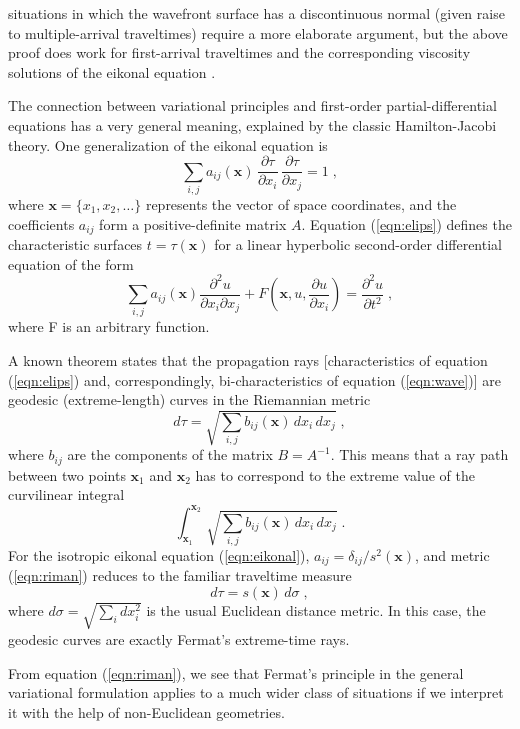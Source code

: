 situations in which the wavefront surface has a discontinuous normal
(given raise to multiple-arrival traveltimes) require a more elaborate
argument, but the above proof does work for first-arrival traveltimes
and the corresponding viscosity solutions of the eikonal equation
\cite[]{lions}.
\par
The connection between variational principles and first-order
partial-differential equations has a very general meaning, explained
by the classic Hamilton-Jacobi theory. One generalization of the
eikonal equation is 
\begin{equation}\label{eqn:elips}
  \sum_{i,j} a_{ij} (\mathbf{x})\,
  \frac{\partial \tau}{\partial x_i}\,
  \frac{\partial \tau}{\partial x_j} = 1\;,
\end{equation}
where $\mathbf{x} = \{x_1, x_2, \ldots\}$ represents the vector of space
coordinates, and the coefficients $a_{ij}$ form a positive-definite
matrix $A$.  Equation (\ref{eqn:elips}) defines the characteristic
surfaces $t = \tau (\mathbf{x})$ for a linear hyperbolic second-order
differential equation of the form
\begin{equation}\label{eqn:wave}
  \sum_{i,j} a_{ij} (\mathbf{x})
  \frac{\partial^2 u}{\partial x_i \partial x_j} +
  F (\mathbf{x}, u, \frac{\partial u}{\partial x_i}) =
  \frac{\partial^2 u}{\partial t^2}\;,
\end{equation}
where F is an arbitrary function.
\par
A known theorem \cite[]{smirnov} states that the propagation rays
[characteristics of equation (\ref{eqn:elips}) and, correspondingly,
bi-characteristics of equation (\ref{eqn:wave})] are geodesic
(extreme-length) curves in the Riemannian metric
\begin{equation}\label{eqn:riman}
  d \tau = \sqrt{\sum_{i,j} b_{ij} (\mathbf{x})\, dx_i\, dx_j}\;,
\end{equation}
where $b_{ij}$ are the components of the matrix $B = A^{-1}$. This
means that a ray path between two points $\mathbf{x}_1$ and $\mathbf{x}_2$
has to correspond to the extreme value of the curvilinear integral
\[
\int_{\mathbf{x}_1}^{\mathbf{x}_2}\,\sqrt{\sum_{i,j} b_{ij} (\mathbf{x})\,
  dx_i\, dx_j}\;.
\]
For the isotropic eikonal equation (\ref{eqn:eikonal}), $a_{ij} =
\delta_{ij}/s^2 (\mathbf{x})$, and metric (\ref{eqn:riman}) reduces to
the familiar traveltime measure
\begin{equation}\label{eqn:simple}
  d \tau = s (\mathbf{x})\, d\sigma\;,
\end{equation}
where $d\sigma = \sqrt{\sum_{i} dx_i^2}$ is the usual Euclidean
distance metric.  In this case, the geodesic curves are exactly
Fermat's extreme-time rays.
\par
From equation (\ref{eqn:riman}), we see that Fermat's principle in the
general variational formulation applies to a much wider class of
situations if we interpret it with the help of non-Euclidean
geometries.

